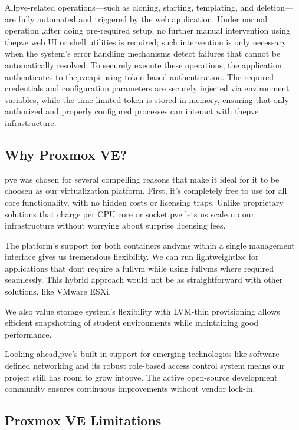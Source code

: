    All\ac{pve}-related operations—such as cloning, starting, templating, and deletion—are fully automated and triggered by the 
    web application. Under normal operation ,after doing pre-required setup, no further manual intervention using the\ac{pve} web 
    UI or shell utilities is required; such intervention is only necessary when the system's error handling mechanisms detect failures 
    that cannot be automatically resolved. To securely execute these operations, the application authenticates to the\ac{pve}\ac{api} 
    using token-based authentication. The required credentials and configuration parameters are securely injected via environment variables, 
    while the time limited token is stored in memory, ensuring that only authorized and properly configured processes can interact 
    with the\ac{pve} infrastructure.

    \subsection{Why Proxmox VE?}

        \ac{pve} was chosen for several compelling reasons that make it ideal for it to be choosen as our virtualization platform. First, 
        it's completely free to use for all core functionality, with no hidden costs or licensing traps. Unlike proprietary solutions that 
        charge per CPU core or socket,\ac{pve} lets us scale up our infrastructure without worrying about surprise licensing fees.

        The platform's support for both containers and\ac{vm}s within a single management interface gives us tremendous flexibility. We 
        can run lightweight\ac{lxc} for applications that dont require a full\ac{vm} while using full\ac{vm}s where required seamlessly. 
        This hybrid approach would not be as straightforward with other solutions, like VMware ESXi.

        We also value storage system's flexibility with LVM-thin provisioning allows efficient snapshotting of student environments while 
        maintaining good performance.

        Looking ahead,\ac{pve}'s built-in support for emerging technologies like software-defined networking and its robust role-based 
        access control system means our project still has room to grow into\ac{pve}. The active open-source development community ensures 
        continuous improvements without vendor lock-in.

    \subsection{Proxmox VE Limitations}

